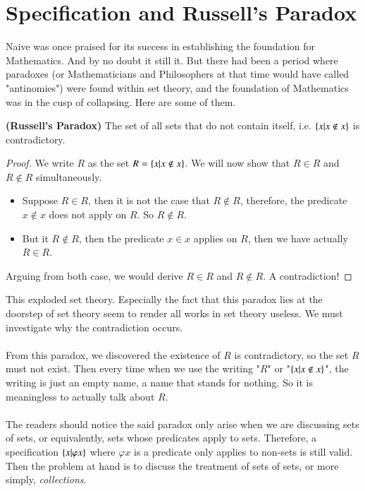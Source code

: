 \section{Specification and Russell's Paradox}
Naive was once praised for its success in establishing the foundation for Mathematics. And by no doubt it still it. But there had been a period where paradoxes (or Mathematicians and Philosophers at that time would have called "antinomies") were found within set theory, and the foundation of Mathematics was in the cusp of collapsing. Here are some of them.\\
\begin{para*}
    \textbf{(Russell's Paradox)} The set of all sets that do not contain itself, i.e. $\{x|x\not\in x\}$ is contradictory.
\end{para*}
\begin{proof}
    We write $R$ as the set $R=\{x|x\not\in x\}$. We will now show that $R\in R$ and $R\not\in R$ simultaneously.
    \begin{itemize}
        \item Suppose $R\in R$, then it is not the case that $R\not\in R$, therefore, the predicate $x\not\in x$ does not apply on $R$. So $R\not\in R$.
        \item But it $R\not\in R$, then the predicate $x\in x$ applies on $R$, then we have actually $R\in R$.
    \end{itemize}
    Arguing from both case, we would derive $R\in R$ and $R\not\in R$. A contradiction!
\end{proof}
This exploded set theory. Especially the fact that this paradox lies at the doorstep of set theory seem to render all works in set theory useless. We must investigate why the contradiction occurs.\\
~\\
From this paradox, we discovered the existence of $R$ is contradictory, so the set $R$ must not exist. Then every time when we use the writing "$R$" or "$\{x|x\not\in x\}$", the writing is just an empty name, a name that stands for nothing. So it is meaningless to actually talk about $R$.\\
~\\
The readers should notice the said paradox only arise when we are discussing sets of sets, or equivalently, sets whose predicates apply to sets. Therefore, a specification $\{x|\varphi x\}$ where $\varphi x$ is a predicate only applies to non-sets is still valid. Then the problem at hand is to discuss the treatment of sets of sets, or more simply, \textit{collections}.\\
